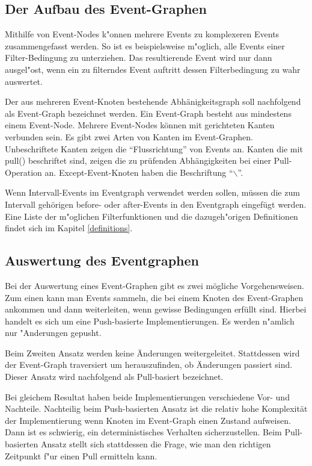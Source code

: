 \subsection{Der Aufbau des Event-Graphen}
Mithilfe von Event-Nodes k"onnen mehrere Events zu komplexeren Events
zusammengefasst werden. So ist es beispielsweise m"oglich, alle Events einer
Filter-Bedingung zu unterziehen. Das resultierende Event wird nur dann
ausgel"ost, wenn ein zu filterndes Event auftritt dessen Filterbedingung zu
wahr auswertet. 

Der aus mehreren Event-Knoten bestehende Abhänigkeitsgraph soll nachfolgend als
Event-Graph bezeichnet werden. Ein Event-Graph besteht aus mindestens einem
Event-Node. Mehrere Event-Nodes können mit gerichteten Kanten verbunden sein. 
Es gibt zwei Arten von Kanten im Event-Graphen. Unbeschriftete Kanten zeigen 
die ``Flussrichtung'' von Events an. Kanten die mit pull() beschriftet sind, 
zeigen die zu prüfenden Abhängigkeiten bei einer Pull-Operation an. 
Except-Event-Knoten haben die Beschriftung ``$\backslash$''.

Wenn Intervall-Events im Eventgraph verwendet werden sollen, müssen die zum
Intervall gehörigen before- oder after-Events in den Eventgraph eingefügt
werden. Eine Liste der m"oglichen Filterfunktionen und die dazugeh"origen 
Definitionen findet sich im Kapitel \ref{definitions}.

\subsection{Auswertung des Eventgraphen}

Bei der Auswertung eines Event-Graphen gibt es zwei mögliche Vorgehensweisen.
Zum einen kann man Events sammeln, die bei einem Knoten des Event-Graphen
ankommen und dann weiterleiten, wenn gewisse Bedingungen erfüllt sind. Hierbei handelt es sich um
eine Push-basierte Implementierungen. Es werden n"amlich nur "Anderungen gepusht.

Beim Zweiten Ansatz werden keine Änderungen weitergeleitet. Stattdessen wird
der Event-Graph traversiert um herauszufinden, ob Änderungen passiert sind. Dieser
Ansatz wird nachfolgend als Pull-basiert bezeichnet.

Bei gleichem Resultat haben beide Implementierungen verschiedene Vor- und
Nachteile. Nachteilig beim Push-basierten Ansatz ist die relativ hohe Komplexität
der Implementierung wenn Knoten im Event-Graph einen Zustand aufweisen.
Dann ist es schwierig, ein deterministisches Verhalten sicherzustellen. Beim
Pull-basierten Ansatz stellt sich stattdessen die Frage, wie man den richtigen
Zeitpunkt f"ur einen Pull ermitteln kann. 

